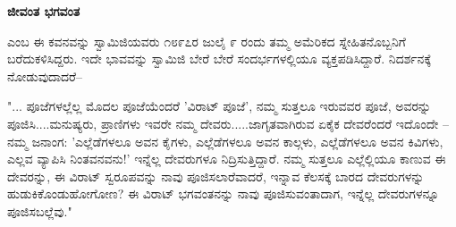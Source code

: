 \begin{myquote}
\end{myquote}

\begin{myquote}
\end{myquote}

\begin{myquote}
\end{myquote}

\begin{myquote}
\end{myquote}

\selectkan

\begin{center}
\textbf{ಜೀವಂತ ಭಗವಂತ}
\end{center}

 ಎಂಬ ಈ ಕವನವನ್ನು ಸ್ವಾಮಿಜಿಯವರು ೧೮೯೭ರ ಜುಲೈ ೯ ರಂದು ತಮ್ಮ ಅಮೆರಿಕದ ಸ್ನೇಹಿತನೊಬ್ಬನಿಗೆ ಬರೆದುಕಳಿಸಿದ್ದರು. ಇದೇ ಭಾವವನ್ನು ಸ್ವಾಮಿಜಿ ಬೇರೆ ಬೇರೆ ಸಂದರ್ಭಗಳಲ್ಲಿಯೂ ವ್ಯಕ್ತಪಡಿಸಿದ್ದಾರೆ. ನಿದರ್ಶನಕ್ಕೆ ನೋಡುವುದಾದರೆ–

"... ಪೂಜೆಗಳಲ್ಲೆಲ್ಲ ಮೊದಲ ಪೂಜೆಯೆಂದರೆ 'ವಿರಾಟ್ ಪೂಜೆ', ನಮ್ಮ ಸುತ್ತಲೂ ಇರುವವರ ಪೂಜೆ, ಅವರನ್ನು ಪೂಜಿಸಿ....ಮನುಷ್ಯರು, ಪ್ರಾಣಿಗಳು ಇವರೇ ನಮ್ಮ ದೇವರು.....ಜಾಗೃತವಾಗಿರುವ ಏಕೈಕ ದೇವರೆಂದರೆ ಇದೊಂದೇ – ನಮ್ಮ ಜನಾಂಗ: 'ಎಲ್ಲೆಡೆಗಳಲೂ ಅವನ ಕೈಗಳು, ಎಲ್ಲೆಡೆಗಳಲೂ ಅವನ ಕಾಲ್ಗಳು, ಎಲ್ಲೆಡೆಗಳಲೂ ಅವನ ಕಿವಿಗಳು, ಎಲ್ಲವ ವ್ಯಾಪಿಸಿ ನಿಂತವನವನು!' ಇನ್ನೆಲ್ಲ ದೇವರುಗಳೂ ನಿದ್ರಿಸುತ್ತಿದ್ದಾರೆ. ನಮ್ಮ ಸುತ್ತಲೂ ಎಲ್ಲೆಲ್ಲಿಯೂ ಕಾಣುವ ಈ ದೇವರನ್ನು, ಈ ವಿರಾಟ್ ಸ್ವರೂಪವನ್ನು ನಾವು ಪೂಜಿಸಲಾರೆವಾದರೆ, ಇನ್ನಾವ ಕೆಲಸಕ್ಕೆ ಬಾರದ ದೇವರುಗಳನ್ನು ಹುಡುಕಿಕೊಂಡುಹೋಗೋಣ? ಈ ವಿರಾಟ್ ಭಗವಂತನನ್ನು ನಾವು ಪೂಜಿಸುವಂತಾದಾಗ, ಇನ್ನೆಲ್ಲ ದೇವರುಗಳನ್ನೂ ಪೂಜಿಸಬಲ್ಲೆವು."

